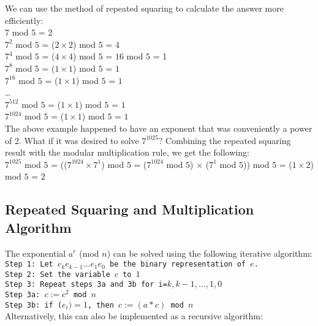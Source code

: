 \documentclass[twoside]{article}
\begin{document}
We can use the method of repeated squaring to calculate the answer more efficiently: \\

$7$ mod $5$ = 2 \\
$7^{2}$ mod $5$ = ($2 \times 2$) mod $5$ = $4$ \\
$7^{4}$ mod $5$ = ($4 \times 4$) mod $5$ = $16$ mod $5$ = 1 \\
$7^{8}$ mod $5$ = ($1 \times 1$) mod $5$ = $1$ \\
$7^{16}$ mod $5$ = ($1 \times 1$) mod $5$ = $1$ \\
\ldots \\
$7^{512}$ mod $5$ = ($1 \times 1$) mod $5$ = $1$ \\
$7^{1024}$ mod $5$ = ($1 \times 1$) mod $5$ = $1$ \\

The above example happened to have an exponent that was conveniently a power of 2. What if it was desired to solve $7^{1025}$? Combining the repeated squaring result with the modular multiplication rule, we get the following: \\

$7^{1025}$ mod $5$ = (($7^{1024} \times 7^{1}$) mod $5$ = ($7^{1024}$ mod $5$) $\times$ ($7^{1}$ mod $5$)) mod $5$ =  ($1 \times 2$) mod $5$ = $2$ \\

\subsection{Repeated Squaring and Multiplication Algorithm}
 The exponential $a^{e}$ (mod $n$) can be solved using the following iterative algorithm:\\
 
 \texttt{Step 1:  Let $e_{k}e_{k-1}\ldots e_{1}e_{0}$ be the binary representation of $e$.} \\
 \texttt{Step 2: Set the variable $c$ to $1$} \\
 \texttt{Step 3: Repeat steps 3a and 3b for i=$k,k-1,\ldots,1,0$} \\
\hspace*{9mm} \texttt{Step 3a: $c := c^2$ mod $n$} \\
\hspace*{9mm} \texttt{Step 3b: if ($e_{i}) = 1$, then $c := (a * c)$ mod $n$} \\

Alternatively, this can also be implemented as a recursive algorithm:
\end{document}
